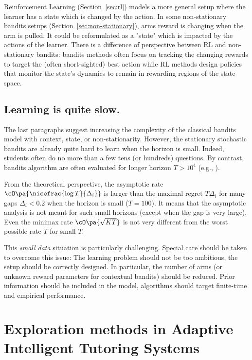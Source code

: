 Reinforcement Learning (Section~\ref{sec:rl}) models a more general setup where the learner has a state which is changed by the action. In some non-stationary bandits setups (Section~\ref{sec:non-stationary}), arms reward is changing when the arm is pulled. It could be reformulated as a "state" which is impacted by the actions of the learner. There is a difference of perspective between RL and non-stationary bandits: bandits methods often focus on tracking the changing rewards to target the (often short-sighted) best action while RL methods design policies that monitor the state's dynamics to remain in rewarding regions of the state space. 

\subsection{Learning is quite slow.}
\label{ss:shortcoming-slow}
The last paragraphs suggest increasing the complexity of the classical bandits model with context, state, or non-stationarity. However, the stationary stochastic bandits are already quite hard to learn when the horizon is small. Indeed, students often do no more than a few tens (or hundreds) questions. By contrast, bandits algorithm are often evaluated for longer horizon $T > 10^4$ (e.g., \citet{chapelle2011empirical}). 

From the theoretical perspective, the asymptotic rate $\cO\pa{\nicefrac{\log T}{\Delta_i}}$ is larger than the maximal regret $T\Delta_i$ for many gaps $\Delta_i < 0.2$ when the horizon is small ($T=100$). It means that the asymptotic analysis is not meant for such small horizons (except when the gap is very large). Even the minimax rate $\cO\pa{\sqrt{KT}}$ is not very different from the worst possible rate $T$ for small $T$.

This \emph{small data} situation is particularly challenging. Special care should be taken to overcome this issue: The learning problem should not be too ambitious, the setup should be correctly designed. In particular, the number of arms (or unknown reward parameters for contextual bandits) should be reduced. Prior information should be included in the model, algorithms should target finite-time and empirical performance.

\section{Exploration methods in Adaptive Intelligent Tutoring Systems}
\label{sec:bandits4ITS}

